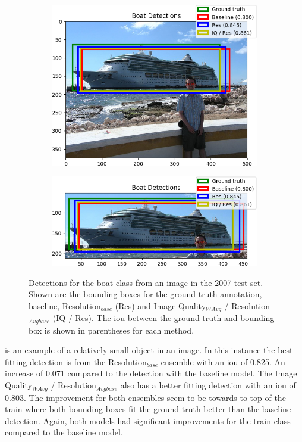 \begin{figure}[H]
    \centering
    \begin{subfigure}[b]{0.45\textwidth}
        \center
        \includegraphics[width=\textwidth]{Figs/Results/000069res.png}
        \caption{}\label{fig:}
    \end{subfigure}
    \begin{subfigure}[b]{0.45\textwidth}
        \center
        \includegraphics[width=\textwidth]{Figs/Results/000069reszoom.png}
        \caption{}\label{fig:}
    \end{subfigure}
    \caption{Detections for the boat class from an image in the 2007 test set. Shown are the bounding boxes for the ground truth annotation, baseline, Resolution$_{base}$ (Res) and Image Quality$_{WAvg}$ / Resolution$_{Avgbase}$ (IQ / Res). The \gls{iou} between the ground truth and bounding box is shown in parentheses for each method.}
    \label{fig:boatres}
\end{figure} 

 is an example of a relatively small object in an image. In this instance the best fitting detection is from the Resolution$_{base}$ ensemble with an \gls{iou} of 0.825. An increase of 0.071 compared to the detection with the baseline model. The Image Quality$_{WAvg}$ / Resolution$_{Avgbase}$ also has a better fitting detection with an \gls{iou} of 0.803. The improvement for both ensembles seem to be towards to top of the train  where both bounding boxes fit the ground truth better than the baseline detection.
Again, both models had significant improvements for the train class compared to the baseline model.

